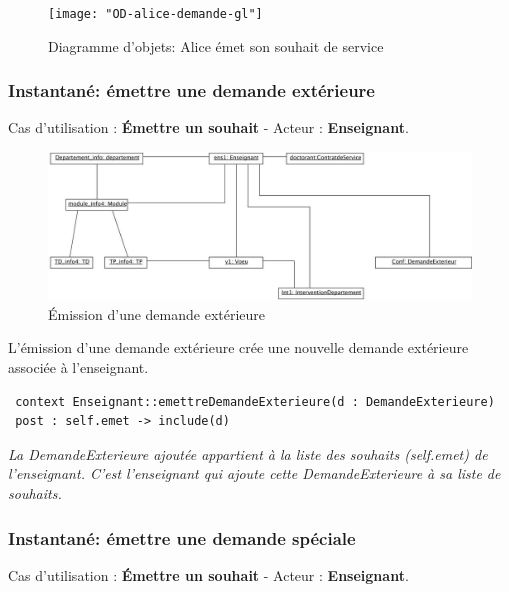 \begin{ocl}
 \begin{figure}[!htbp]
 \begin{center}
 \texttt{[image: "OD-alice-demande-gl"]}
 \caption{Diagramme d'objets: Alice émet son souhait de service}
 \end{center}
 \label{fig:souhait-alice}
 \end{figure}


 \subsubsection{Instantané: émettre une demande extérieure}
 \indent Cas d'utilisation : \textbf{\'Emettre un souhait} - Acteur : \textbf{Enseignant}.

 \begin{figure}[!htbp]
 \begin{center}
 \includegraphics[width=14cm]{fig/5-EmissionDemandeExterieur.jpg}
 \caption{\'Emission d'une demande extérieure}
 \end{center}
 \end{figure}

 \indent L'émission d'une demande extérieure crée une nouvelle demande extérieure associée à l'enseignant.
 \begin{verbatim}
 context Enseignant::emettreDemandeExterieure(d : DemandeExterieure)
 post : self.emet -> include(d)
 \end{verbatim}
 \emph{La DemandeExterieure ajoutée appartient à la liste des souhaits (self.emet) de l'enseignant. C'est l'enseignant qui ajoute cette DemandeExterieure à sa liste de souhaits.}

 \subsubsection{Instantané: émettre une demande spéciale}
 \indent Cas d'utilisation : \textbf{\'Emettre un souhait} - Acteur : \textbf{Enseignant}.


\end{ocl}

